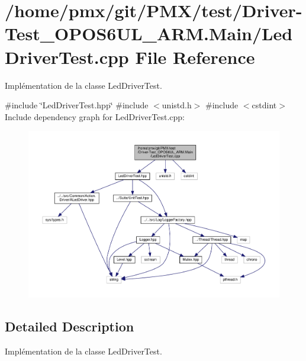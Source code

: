 \hypertarget{Driver-Test__OPOS6UL__ARM_8Main_2LedDriverTest_8cpp}{}\section{/home/pmx/git/\+P\+M\+X/test/\+Driver-\/\+Test\+\_\+\+O\+P\+O\+S6\+U\+L\+\_\+\+A\+RM.Main/\+Led\+Driver\+Test.cpp File Reference}
\label{Driver-Test__OPOS6UL__ARM_8Main_2LedDriverTest_8cpp}


Implémentation de la classe Led\+Driver\+Test.  


{\ttfamily \#include \char`\"{}Led\+Driver\+Test.\+hpp\char`\"{}}\newline
{\ttfamily \#include $<$unistd.\+h$>$}\newline
{\ttfamily \#include $<$cstdint$>$}\newline
Include dependency graph for Led\+Driver\+Test.\+cpp\+:
\nopagebreak
\begin{figure}[H]
\begin{center}
\leavevmode
\includegraphics[width=350pt]{Driver-Test__OPOS6UL__ARM_8Main_2LedDriverTest_8cpp__incl}
\end{center}
\end{figure}


\subsection{Detailed Description}
Implémentation de la classe Led\+Driver\+Test. 

